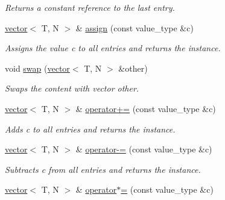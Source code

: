 \begin{DoxyCompactItemize}
\begin{DoxyCompactList}\small\item\em Returns a constant reference to the last entry. \end{DoxyCompactList}\item 
\hypertarget{a00579_a3dd094e0c18ed733564b2264e741381d}{}\hyperlink{a00579}{vector}$<$ T, N $>$ \& \hyperlink{a00579_a3dd094e0c18ed733564b2264e741381d}{assign} (const value\+\_\+type \&c)\label{a00579_a3dd094e0c18ed733564b2264e741381d}

\begin{DoxyCompactList}\small\item\em Assigns the value c to all entries and returns the instance. \end{DoxyCompactList}\item 
\hypertarget{a00579_a6e359a635d719507448134b4239602bd}{}void \hyperlink{a00579_a6e359a635d719507448134b4239602bd}{swap} (\hyperlink{a00579}{vector}$<$ T, N $>$ \&other)\label{a00579_a6e359a635d719507448134b4239602bd}

\begin{DoxyCompactList}\small\item\em Swaps the content with vector other. \end{DoxyCompactList}\item 
\hypertarget{a00579_ad1a87c1ba015adaeb88433315ef38071}{}\hyperlink{a00579}{vector}$<$ T, N $>$ \& \hyperlink{a00579_ad1a87c1ba015adaeb88433315ef38071}{operator+=} (const value\+\_\+type \&c)\label{a00579_ad1a87c1ba015adaeb88433315ef38071}

\begin{DoxyCompactList}\small\item\em Adds c to all entries and returns the instance. \end{DoxyCompactList}\item 
\hypertarget{a00579_ae2f6dbb764120f23560a30ca98b34a6b}{}\hyperlink{a00579}{vector}$<$ T, N $>$ \& \hyperlink{a00579_ae2f6dbb764120f23560a30ca98b34a6b}{operator-\/=} (const value\+\_\+type \&c)\label{a00579_ae2f6dbb764120f23560a30ca98b34a6b}

\begin{DoxyCompactList}\small\item\em Subtracts c from all entries and returns the instance. \end{DoxyCompactList}\item 
\hypertarget{a00579_a1401bd51aae87d4182645dcc6d2007cf}{}\hyperlink{a00579}{vector}$<$ T, N $>$ \& \hyperlink{a00579_a1401bd51aae87d4182645dcc6d2007cf}{operator$\ast$=} (const value\+\_\+type \&c)\label{a00579_a1401bd51aae87d4182645dcc6d2007cf}


\end{DoxyCompactItemize}
